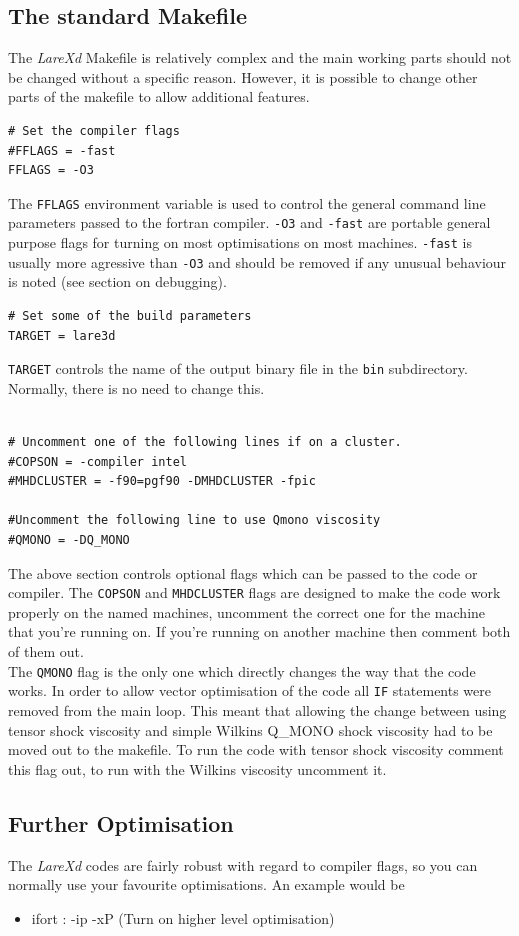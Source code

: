 \documentclass[11pt]{article}
\begin{document}
\subsection{The standard Makefile}
The {\it LareXd} Makefile is relatively complex and the main working parts should not be changed without a specific reason. However, it is possible to change other parts of the makefile to allow additional features.\\
\begin{verbatim}
# Set the compiler flags
#FFLAGS = -fast
FFLAGS = -O3
\end{verbatim}
The \texttt{FFLAGS} environment variable is used to control the general command line parameters passed to the fortran compiler. \texttt{-O3} and \texttt{-fast} are portable general purpose flags for turning on most optimisations on most machines. \texttt{-fast} is usually more agressive than \texttt{-O3} and should be removed if any unusual behaviour is noted (see section on debugging).
\begin{verbatim}
# Set some of the build parameters
TARGET = lare3d
\end{verbatim}
\texttt{TARGET} controls the name of the output binary
file in the \texttt{bin} subdirectory. Normally, there is no need to change this.
\begin{verbatim}

# Uncomment one of the following lines if on a cluster.
#COPSON = -compiler intel
#MHDCLUSTER = -f90=pgf90 -DMHDCLUSTER -fpic

#Uncomment the following line to use Qmono viscosity
#QMONO = -DQ_MONO
\end{verbatim}
The above section controls optional flags which can be passed to the code or compiler.  The \texttt{COPSON} and \texttt{MHDCLUSTER} flags are designed to make the code work properly on the named machines, uncomment the correct one for the machine that you're running on. If you're running on another machine then comment both of them out.\\
The \texttt{QMONO} flag is the only one which directly changes the way that the code works. In order to allow vector optimisation of the code all \texttt{IF} statements were removed from the main loop. This meant that allowing the change between using tensor shock viscosity and simple Wilkins Q\_MONO shock viscosity had to be moved out to the makefile. To run the code with tensor shock viscosity comment this flag out, to run with the Wilkins viscosity uncomment it.
\subsection{Further Optimisation}
The {\it LareXd} codes are fairly robust with regard to compiler flags, so you can normally use your favourite optimisations. An example would be
\begin{itemize}
\item ifort : -ip -xP (Turn on higher level optimisation)
\end{itemize}
\end{document}
